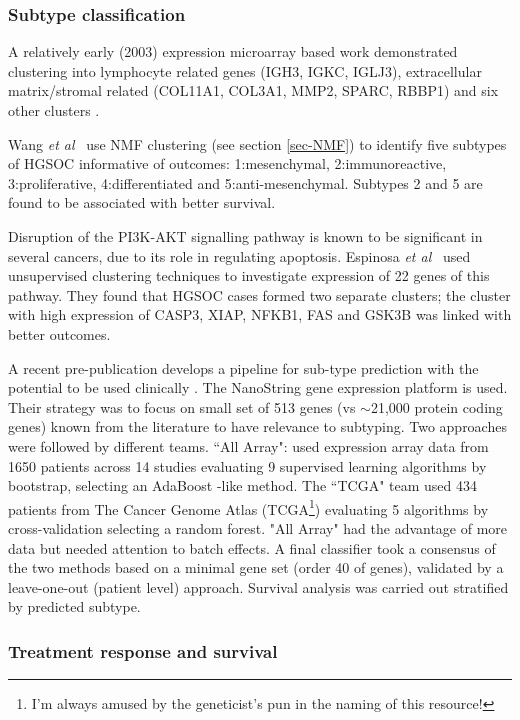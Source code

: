 \documentclass[draft, tikz, 12pt,a4paper,oneside,fleqn]{article}
\newcommand{\etal}{{\em et al\/}}
\begin{document}
\subsubsection{Subtype classification}

A relatively early (2003) expression microarray based work demonstrated clustering into lymphocyte related genes (IGH3, IGKC, IGLJ3), extracellular matrix/stromal related (COL11A1, COL3A1, MMP2, SPARC, RBBP1) and six other clusters \cite{Schaner2003}.

Wang \etal\ \cite{Wang2017c} use NMF clustering (see section \ref{sec-NMF}) to identify five subtypes of HGSOC informative of outcomes: 1:mesenchymal, 2:immunoreactive, 3:proliferative, 4:differentiated and 5:anti-mesenchymal.
Subtypes 2 and 5 are found to be associated with better survival.

Disruption of the PI3K-AKT signalling pathway is known to be significant in several cancers, due to its role in regulating apoptosis.  
Espinosa \etal\ \cite{Espinosa2011} used unsupervised clustering techniques to investigate expression of 22 genes of this pathway.  
They found that HGSOC cases formed two separate clusters; the cluster with high expression of CASP3, XIAP, NFKB1, FAS and GSK3B was linked with better outcomes.

A recent pre-publication develops a pipeline for sub-type prediction with the potential to be used clinically \cite{Talhouk2020}.
The NanoString gene expression platform is used.  Their strategy was to focus on small set of 513 genes (vs $\sim$21,000 protein coding genes) known from the literature to have relevance to subtyping.
Two approaches were followed by different teams.  ``All Array": used expression array data from 1650 patients across 14 studies evaluating 9 supervised learning algorithms by bootstrap, selecting an AdaBoost -like method. The ``TCGA" team used 434 patients from The Cancer Genome Atlas (TCGA\footnote{I'm always amused by the geneticist's pun in the naming of this resource!}) evaluating 5 algorithms by cross-validation selecting a random forest.  "All Array" had the advantage of more data but needed attention to batch effects. A final classifier took a consensus of the two methods based on a minimal gene set (order 40 of genes), validated by a leave-one-out (patient level) approach.  Survival analysis was carried out stratified by predicted subtype.

\subsubsection{Treatment response and survival}
\end{document}
